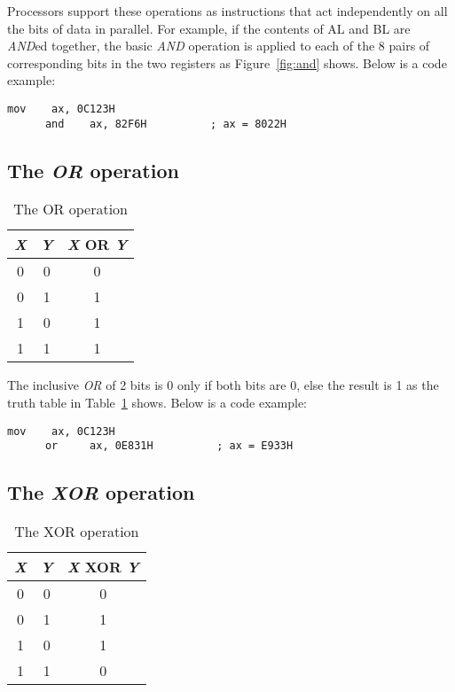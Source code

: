 Processors support these operations as instructions that act 
independently on all the bits of data in parallel. For example, if the contents
of {\code AL} and {\code BL} are \emph{AND}ed together, the basic \emph{AND}
operation is applied to each of the 8 pairs of corresponding bits in the
two registers as Figure~\ref{fig:and} shows. Below is a code example:
\begin{lstlisting}[language={[x86masm]Assembler}]
      mov    ax, 0C123H
      and    ax, 82F6H          ; ax = 8022H
\end{lstlisting}

\subsection{The \emph{OR} operation}

\begin{table}[t]
\centering
\begin{tabular}{|c|c|c|}
\hline
\emph{X} & \emph{Y} & \emph{X} OR \emph{Y} \\
\hline \hline
0 & 0 & 0 \\
0 & 1 & 1 \\
1 & 0 & 1 \\
1 & 1 & 1 \\
\hline
\end{tabular}
\caption{The OR operation \label{tab:or} }
\end{table}


The inclusive \emph{OR} of 2 bits is 0 only if both bits are 0, else
the result is 1 as the truth table in Table~\ref{tab:or} shows. Below
is a code example:

\begin{lstlisting}[language={[x86masm]Assembler}]
      mov    ax, 0C123H
      or     ax, 0E831H          ; ax = E933H
\end{lstlisting}

\subsection{The \emph{XOR} operation}

\begin{table}
\centering
\begin{tabular}{|c|c|c|}
\hline
\emph{X} & \emph{Y} & \emph{X} XOR \emph{Y} \\
\hline
0 & 0 & 0 \\
0 & 1 & 1 \\
1 & 0 & 1 \\
1 & 1 & 0 \\
\hline
\end{tabular}
\caption{The XOR operation \label{tab:xor}}
\end{table}


